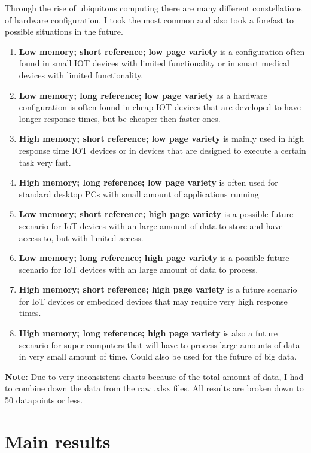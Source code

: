 \documentclass[12pt, reqno]{amsart}
\numberwithin{equation}{section}
\begin{document}
Through the rise of ubiquitous computing there are many different constellations of hardware configuration.
I took the most common and also took a forefast to possible situations in the future.
\begin{enumerate}
    \item \textbf{Low memory; short reference; low page variety} is a configuration often found in small IOT devices 
    with limited functionality or in smart medical devices with limited functionality.
    \item \textbf{Low memory; long reference; low page variety} as a hardware configuration is often found in cheap IOT devices 
    that are developed to have longer response times, but be cheaper then faster ones.
    \item \textbf{High memory; short reference; low page variety} is mainly used in high response time
    IOT devices or in devices that are designed to execute a certain task very fast.
    \item \textbf{High memory; long reference; low page variety} is often used for standard desktop PCs with small amount of applications running
    \item \textbf{Low memory; short reference; high page variety} is a possible future scenario for IoT devices with an large amount of data to store and have access to, but with
    limited access.
    \item \textbf{Low memory; long reference; high page variety} is a possible future scenario for IoT devices with an large amount of
    data to process.
    \item \textbf{High memory; short reference; high page variety} is a future scenario for IoT devices or embedded devices that
    may require very high response times.
    \item \textbf{High memory; long reference; high page variety} is also a future scenario for super computers that will have to
    process large amounts of data in very small amount of time. Could also be used for the future of big data.
\end{enumerate} 

\textbf{Note:} Due to very inconsistent charts because of the total amount of data, I had to combine down the data from the raw .xlsx files. All results are broken down
to 50 datapoints or less.


\section{Main results}
\end{document}
